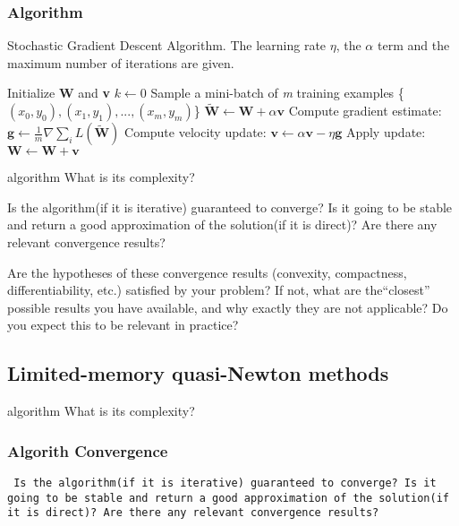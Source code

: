 \subsubsection{Algorithm}
\begin{algorithm}[H]
	\caption{Stochastic Gradient Descent Algorithm. The learning rate $\eta$, the $\alpha$ term and the maximum number of iterations are given.}
	\label{alg:sgd}
	\begin{algorithmic}[1]
		\State Initialize \textbf{W} and \textbf{v}
		\State $k \gets 0$
		\State Sample a mini-batch of \textit{m} training examples \{\textit{$(x_0,y_0),(x_1,y_1),...,(x_m,y_m)$}\}
		\State $\tilde{\textbf{W}} \gets \textbf{W} + \alpha \textbf{v}$
		\EndIf
		\State Compute gradient estimate: $\textbf{g} \gets \frac {1}{m} \nabla \sum_i\textit{L}(\tilde{\textbf{W}})$
		\State Compute velocity update: $\textbf{v} \gets \alpha \textbf{v} - \eta \textbf{g}$
		\State Apply update: $\textbf{W} \gets \textbf{W} + \textbf{v}$
		\EndWhile
		\EndProcedure
	\end{algorithmic}
\end{algorithm}



 algorithm What is its complexity?

Is the algorithm(if it is iterative) guaranteed to converge? Is it going to be stable and return a good approximation of the solution(if it is direct)?  Are there any relevant convergence results?

Are the hypotheses of these convergence results (convexity, compactness, differentiability, etc.) satisfied by your problem? If not, what are the“closest” possible results you have available, and why exactly they are not applicable?  Do you expect this to be relevant in practice?

\subsection{Limited-memory quasi-Newton methods}



 algorithm What is its complexity?

\subsubsection{Algorith Convergence}
\texttt{ Is the algorithm(if it is iterative) guaranteed to converge? Is it going to be stable and return a good approximation of the solution(if it is direct)?  Are there any relevant convergence results?}

